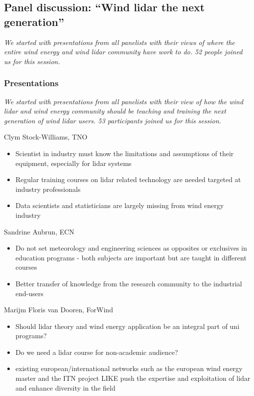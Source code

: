 \subsection{Panel discussion: \enquote{Wind lidar the next generation}}

\emph{We started with presentations from all panelists with their views
	of where the entire wind energy and wind lidar community have work to
do. 52 people joined us for this session.}

\subsubsection{Presentations}
\emph{We started with presentations from all panelists with their view
	of how the wind lidar and wind energy community should be teaching and
	training the next generation of wind lidar users. 53 participants joined
us for this session.}

Clym Stock-Williams, TNO

\begin{itemize}
	\item Scientist in industry must know the limitations and assumptions of
	      their equipment, especially for lidar systems
	\item Regular training courses on lidar related technology are needed
	      targeted at industry professionals
	\item Data scientists and statisticians are largely missing from wind energy
	      industry
\end{itemize}

Sandrine Aubrun, ECN

\begin{itemize}
	\item Do not set meteorology and engineering sciences as opposites or
	      exclusives in education programs - both subjects are important but are
	      taught in different courses
	\item Better transfer of knowledge from the research community to the
	      industrial end-users
\end{itemize}

Marijm Floris van Dooren, ForWind

\begin{itemize}
	\item Should lidar theory and wind energy application be an integral part of
	      uni programs?
	\item Do we need a lidar course for non-academic audience?
	\item existing european/international networks such as the european wind
	      energy master and the ITN project LIKE push the expertise and
	      exploitation of lidar and enhance diversity in the field
\end{itemize}

